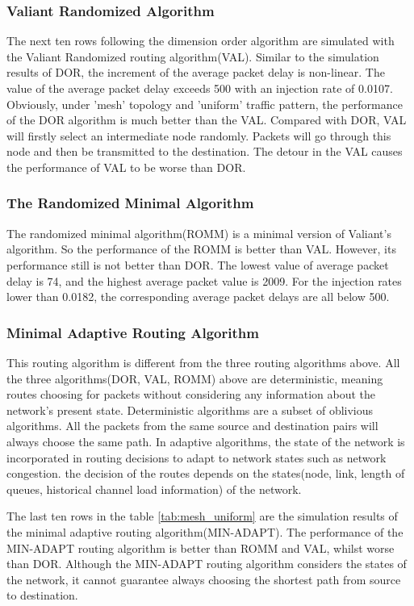 \subsubsection{Valiant Randomized Algorithm}
The next ten rows following the dimension order algorithm are simulated with the Valiant Randomized routing algorithm(VAL). Similar to the simulation results of DOR, the increment of the average packet delay is non-linear. The value of the average packet delay exceeds 500 with an injection rate of 0.0107. Obviously, under 'mesh' topology and 'uniform' traffic pattern, the performance of the DOR algorithm is much better than the VAL. Compared with DOR, VAL will firstly select an intermediate node randomly. Packets will go through this node and then be transmitted to the destination. The detour in the VAL causes the performance of VAL to be worse than DOR.

\subsubsection{The Randomized Minimal Algorithm}
The randomized minimal algorithm(ROMM) is a minimal version of Valiant's algorithm. So the performance of the ROMM is better than VAL. However, its performance still is not better than DOR. The lowest value of average packet delay is 74, and the highest average packet value is 2009. For the injection rates lower than 0.0182, the corresponding average packet delays are all below 500.

\subsubsection{Minimal Adaptive Routing Algorithm}
This routing algorithm is different from the three routing algorithms above. All the three algorithms(DOR, VAL, ROMM) above are deterministic, meaning routes choosing for packets without considering any information about the network's present state. Deterministic algorithms are a subset of oblivious algorithms. All the packets from the same source and destination pairs will always choose the same path. In adaptive algorithms, the state of the network is incorporated in routing decisions to adapt to network states such as network congestion. the decision of the routes depends on the states(node, link, length of queues, historical channel load information) of the network.

The last ten rows in the table \ref{tab:mesh_uniform} are the simulation results of the minimal adaptive routing algorithm(MIN-ADAPT). The performance of the MIN-ADAPT routing algorithm is better than ROMM and VAL, whilst worse than DOR. Although the MIN-ADAPT routing algorithm considers the states of the network, it cannot guarantee always choosing the shortest path from source to destination.

